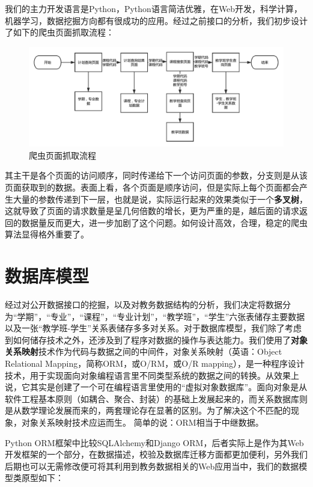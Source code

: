 \documentclass[UTF8, zihao=-4]{ctexart}
\begin{document}
    我们的主力开发语言是Python，Python语言简洁优雅，在Web开发，科学计算，机器学习，数据挖掘方向都有很成功的应用。经过之前接口的分析，我们初步设计了如下的爬虫页面抓取流程：
    
    \begin{figure}
        \centering
        \includegraphics[width=1.0\linewidth]{figure/seq1}
        \caption{爬虫页面抓取流程}
        \label{fig:seq1}
    \end{figure}
    
    其主干是各个页面的访问顺序，同时传递给下一个访问页面的参数，分支则是从该页面获取到的数据。表面上看，各个页面是顺序访问，但是实际上每个页面都会产生大量的参数传递到下一层，也就是说，实际运行起来的效果类似于一个\textbf{多叉树}，这就导致了页面的请求数量是呈几何倍数的增长，更为严重的是，越后面的请求返回的数据量反而更大，进一步加剧了这个问题。如何设计高效，合理，稳定的爬虫算法显得格外重要了。
    
    \section{数据库模型}
    经过对公开数据接口的挖掘，以及对教务数据结构的分析，我们决定将数据分为“学期”，“专业”，“课程”，“专业计划”，“教学班”，“学生”六张表储存主要数据以及一张“教学班-学生”关系表储存多多对关系。对于数据库模型，我们除了考虑到如何储存技术之外，还涉及到了程序对数据的操作与表达能力。我们使用了\textbf{对象关系映射}技术作为代码与数据之间的中间件，对象关系映射（英语：Object Relational Mapping，简称ORM，或O/RM，或O/R mapping），是一种程序设计技术，用于实现面向对象编程语言里不同类型系统的数据之间的转换。从效果上说，它其实是创建了一个可在编程语言里使用的“虚拟对象数据库”。面向对象是从软件工程基本原则（如耦合、聚合、封装）的基础上发展起来的，而关系数据库则是从数学理论发展而来的，两套理论存在显著的区别。为了解决这个不匹配的现象，对象关系映射技术应运而生。
    简单的说：ORM相当于中继数据。\cite{wiki:Object-relational_mapping}
    
    Python ORM框架中比较SQLAlchemy和Django ORM，后者实际上是作为其Web开发框架的一个部分，在数据描述，校验及数据库迁移方面都更加便利，另外我们后期也可以无需修改便可将其利用到教务数据相关的Web应用当中，我们的数据模型类原型如下：
    
\end{document}

